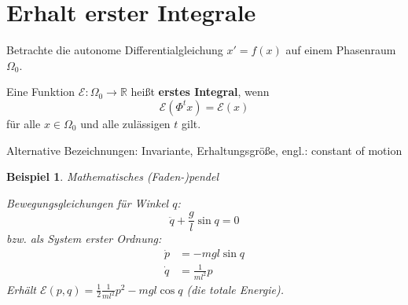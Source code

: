 \documentclass[german]{scrreprt}
\newcommand{\begriff}[1]{\textbf{#1}}
\newcommand{\R}{\mathbb R}
\theoremstyle{plain}
\theoremstyle{nonumberplain}
\theoremstyle{nonumberplain}
\newtheorem{bsp}{Beispiel}
\theoremstyle{nonumberplain}
\begin{document}

\renewcommand*\contentsname{\huge \centering Optimierung \& Numerik --- Vorlesung 11}
\tableofcontents


\setcounter{chapter}{11}
\setcounter{section}{7}
\setcounter{satz}{17}
\setcounter{lemma}{14}
\setcounter{equation}{4}

\section{Erhalt erster Integrale}

Betrachte die autonome Differentialgleichung $x'=f(x)$ auf einem Phasenraum $\Omega_0$.

\begin{definition}
	Eine Funktion $\mathcal E \colon \Omega_0 \to \R$ heißt \begriff{erstes Integral}, wenn
	\begin{equation*}
	\mathcal E(\Phi^t x) = \mathcal E(x)
	\end{equation*}
	für alle $x\in\Omega_0$ und alle zulässigen $t$ gilt.
\end{definition}

Alternative Bezeichnungen: Invariante, Erhaltungsgröße, engl.: constant of motion

\begin{bsp}
	Mathematisches (Faden-)pendel
	\begin{center}
	\end{center}
	
	Bewegungsgleichungen für Winkel $q$:
	\begin{equation*}
	\ddot{q} + \frac{g}{l} \sin q = 0
	\end{equation*}
	bzw. als System erster Ordnung:
	\begin{equation*}
	\begin{aligned}
	\dot{p} &= - mgl \sin q\\
	\dot{q} &= \frac{1}{ml^2} p
	\end{aligned}
	\end{equation*}
	Erhält $\mathcal E(p,q) = \frac{1}{2} \frac{1}{ml^2} p^2 - mgl \cos q $ (die totale Energie).
\end{bsp}
\end{document}
